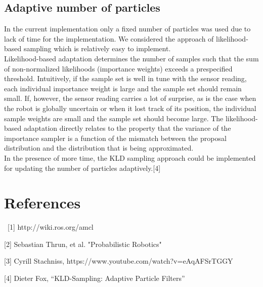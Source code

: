 \documentclass{article}
\begin{document}
\subsection{Adaptive number of particles}

In the current implementation only a fixed number of particles was used due to lack of time for the implementation. We considered the approach of likelihood-based sampling which is relatively easy to implement. \\
Likelihood-based adaptation determines the number of samples such that the sum of non-normalized likelihoods (importance weights) exceeds a prespecified threshold. Intuitively, if the sample set is well in tune with the sensor reading, each individual importance weight is large and the sample set should remain small. If, however, the sensor reading carries a lot of surprise, as is the case when the robot is globally uncertain or when it lost track of its position, the individual sample weights are small and the sample set should become large. The likelihood-based adaptation directly relates to the property that the variance of the importance sampler is a function of the mismatch between the proposal distribution and the distribution that is being approximated. \\
In the presence of more time, the KLD sampling approach could be implemented for updating the number of particles adaptively.[4]


\section{References}\
[1] http://wiki.ros.org/amcl 

[2] Sebastian Thrun, et al. "Probabilistic Robotics"

[3] Cyrill Stachniss,  https://www.youtube.com/watch?v=eAqAFSrTGGY

[4] Dieter Fox, ``KLD-Sampling: Adaptive Particle Filters''
\end{document}

